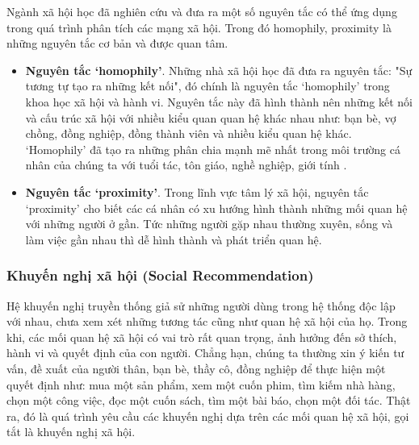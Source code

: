 Ngành xã hội học đã nghiên cứu và đưa ra một số nguyên tắc có thể ứng dụng trong quá trình phân tích các mạng xã hội. Trong đó homophily, proximity là những nguyên tắc cơ bản và được quan tâm.
\begin{itemize}
\item \textbf{Nguyên tắc `homophily'}. Những nhà xã hội học đã đưa ra nguyên tắc: "Sự tương tự tạo ra những kết nối", đó chính là nguyên tắc `homophily' trong khoa học xã hội và hành vi. Nguyên tắc này đã hình thành nên những kết nối và cấu trúc xã hội với nhiều kiểu quan quan hệ khác nhau như: bạn bè, vợ chồng, đồng nghiệp, đồng thành viên và nhiều kiểu quan hệ khác. `Homophily' đã tạo ra những phân chia mạnh mẽ nhất trong môi trường cá nhân của chúng ta với tuổi tác, tôn giáo, nghề nghiệp, giới tính \cite{mcpherson2001birds}. \label{concept:homophily}
\item \textbf{Nguyên tắc `proximity'}. Trong lĩnh vực tâm lý xã hội, nguyên tắc `proximity' cho biết các cá nhân có xu hướng hình thành những mối quan hệ với những người ở gần. Tức những người gặp nhau thường xuyên, sống và làm việc gần nhau thì dễ hình thành và phát triển quan hệ.\label{concept:proximity}
\end{itemize}

\subsubsection{Khuyến nghị xã hội (Social Recommendation)}
Hệ khuyến nghị truyền thống giả sử những người dùng trong hệ thống độc lập với nhau, chưa xem xét những tương tác cũng như quan hệ xã hội của họ. Trong khi, các mối quan hệ xã hội có vai trò rất quan trọng, ảnh hưởng đến sở thích, hành vi và quyết định của con người. Chẳng hạn, chúng ta thường xin ý kiến tư vấn, đề xuất của người thân, bạn bè, thầy cô, đồng nghiệp để thực hiện một quyết định như: mua một sản phẩm, xem một cuốn phim, tìm kiếm nhà hàng, chọn một công việc, đọc một cuốn sách, tìm một bài báo, chọn một đối tác. Thật ra, đó là quá trình yêu cầu các khuyến nghị dựa trên các mối quan hệ xã hội, gọi tắt là khuyến nghị xã hội.


